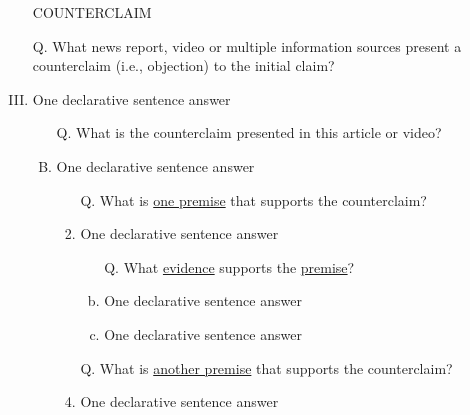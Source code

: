 \documentclass[a4paper, 12pt]{article}
\begin{document}
\begin{CJK*}{UTF8}{bsmi}
\begin{enumerate}[I.]
\begin{enumerate}[A.]
\begin{enumerate}[1.]
                              \end{enumerate}
                  \end{enumerate}
            \item [] {\color{red}COUNTERCLAIM}
            \item [Q.] What news report, video or multiple information sources present a {\color{red} counterclaim} (i.e., objection) to
                  the {\color{blue} initial claim}?
            \item {\color{gray} One declarative sentence answer} %
                  \begin{enumerate}[A.]
                        \item [Q.] What is the {\color{red} counterclaim} presented in this article or video?
                        \item {\color{gray} One declarative sentence answer} %
                              \begin{enumerate}[1.]
                                    \item[Q.] What is \underline{one premise} that supports the {\color{red}counterclaim}?
                                    \item{\color{gray} One declarative sentence answer} %
                                          \begin{enumerate}[a.]
                                                \item [Q.] What \underline{evidence} supports the \underline{premise}?
                                                \item {\color{gray} One declarative sentence answer} %
                                                \item {\color{gray} One declarative sentence answer} %
                                          \end{enumerate}
                                    \item [Q.] What is \underline{another premise} that supports the {\color{red}counterclaim}?
                                    \item{\color{gray} One declarative sentence answer} %
                                          \begin{enumerate}[a.]

\end{enumerate}
\end{enumerate}
\end{enumerate}
\end{enumerate}
\end{CJK*}
\end{document}
